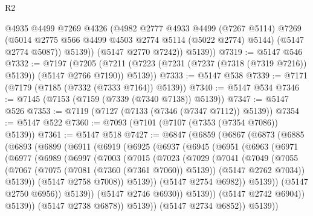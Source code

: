 \begin{lexlean}{R2}
\begin{coremodule}
              @4935
              @4499
              @7269
              @4326
              (@4982
                @2777
                @4933
                @4499
                (@7267 @5114)
                @7269
                (@5014 @2775 @566 @4499 @4503 @2774 @5114 (@5022 @2774) @5144)
                (@5147 @2774 @5087))
              @5139))
          (@5147 @2770 @7242))
        @5139))
@7319 := @5147 @546
@7332 := @7197
    (@7205 (@7211 (@7223 (@7231 (@7237 (@7318 (@7319 @7216)) @5139)) (@5147 @2766 @7190)) @5139))
@7333 := @5147 @538
@7339 := @7171 (@7179 (@7185 (@7332 (@7333 @7164)) @5139))
@7340 := @5147 @534
@7346 := @7145 (@7153 (@7159 (@7339 (@7340 @7138)) @5139))
@7347 := @5147 @526
@7353 := @7119 (@7127 (@7133 (@7346 (@7347 @7112)) @5139))
@7354 := @5147 @522
@7360 := @7093 (@7101 (@7107 (@7353 (@7354 @7086)) @5139))
@7361 := @5147 @518
@7427 := @6847
    (@6859
      (@6867
        (@6873
          (@6885
            (@6893
              (@6899
                (@6911
                  (@6919
                    (@6925
                      (@6937
                        (@6945
                          (@6951
                            (@6963
                              (@6971
                                (@6977
                                  (@6989
                                    (@6997
                                      (@7003
                                        (@7015
                                          (@7023
                                            (@7029
                                              (@7041
                                                (@7049
                                                  (@7055
                                                    (@7067
                                                      (@7075 (@7081 (@7360 (@7361 @7060)) @5139))
                                                      (@5147 @2762 @7034))
                                                    @5139))
                                                (@5147 @2758 @7008))
                                              @5139))
                                          (@5147 @2754 @6982))
                                        @5139))
                                    (@5147 @2750 @6956))
                                  @5139))
                              (@5147 @2746 @6930))
                            @5139))
                        (@5147 @2742 @6904))
                      @5139))
                  (@5147 @2738 @6878))
                @5139))
            (@5147 @2734 @6852))
          @5139))

\end{coremodule}
\end{lexlean}
